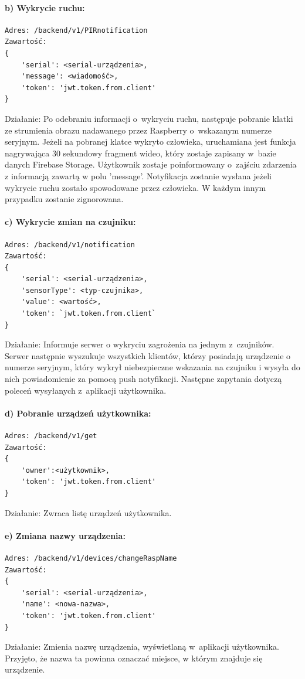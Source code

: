 \paragraph{b) Wykrycie ruchu:}
\begin{verbatim}
Adres: /backend/v1/PIRnotification
Zawartość: 
{
	'serial': <serial-urządzenia>, 
	'message': <wiadomość>, 
	'token': 'jwt.token.from.client'
}
\end{verbatim}
Działanie: Po odebraniu informacji o~wykryciu ruchu, następuje pobranie klatki ze strumienia obrazu nadawanego przez Raspberry o~wskazanym numerze seryjnym. Jeżeli na pobranej klatce wykryto człowieka, uruchamiana jest funkcja nagrywająca 30 sekundowy fragment wideo, który zostaje zapisany w~bazie danych Firebase Storage. Użytkownik zostaje poinformowany o~zajściu zdarzenia z informacją zawartą w polu 'message'. Notyfikacja zostanie wysłana jeżeli wykrycie ruchu zostało spowodowane przez człowieka. W każdym innym przypadku zostanie zignorowana.

\paragraph{c) Wykrycie zmian na czujniku:}
\begin{verbatim}
Adres: /backend/v1/notification
Zawartość: 
{
	'serial': <serial-urządzenia>, 
	'sensorType': <typ-czujnika>, 
	'value': <wartość>, 
	'token': `jwt.token.from.client`
}
\end{verbatim}
Działanie: Informuje serwer o wykryciu zagrożenia na jednym z~czujników. Serwer następnie wyszukuje wszystkich klientów, którzy posiadają urządzenie o numerze seryjnym, który wykrył niebezpieczne wskazania na czujniku i wysyła do nich powiadomienie za pomocą push notyfikacji. \newline
Następne zapytania dotyczą poleceń wysyłanych z~aplikacji użytkownika.
\paragraph{d) Pobranie urządzeń użytkownika:}
\begin{verbatim}
Adres: /backend/v1/get
Zawartość: 
{
	'owner':<użytkownik>, 
	'token': 'jwt.token.from.client'
}
\end{verbatim}
Działanie: Zwraca listę urządzeń użytkownika.
\paragraph{e) Zmiana nazwy urządzenia:}
\begin{verbatim}
Adres: /backend/v1/devices/changeRaspName
Zawartość:
{
	'serial': <serial-urządzenia>, 
	'name': <nowa-nazwa>, 
	'token': 'jwt.token.from.client'
}
\end{verbatim}
Działanie: Zmienia nazwę urządzenia, wyświetlaną w~aplikacji użytkownika. Przyjęto, że nazwa ta powinna oznaczać miejsce, w którym znajduje się urządzenie.
